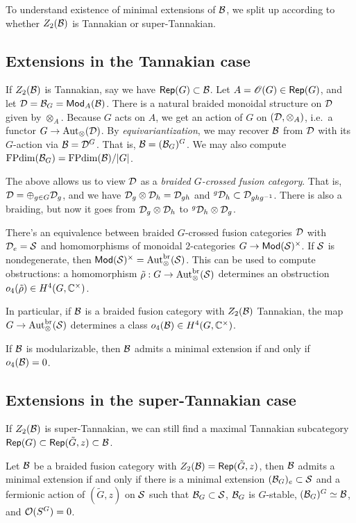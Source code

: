 \documentclass{amsart}
\begin{document}
To understand existence of minimal extensions of $\mathcal{B}$, we split up according to whether $Z_2(\mathcal{B})$ is Tannakian or super-Tannakian.

\subsection{Extensions in the Tannakian case}

If $Z_2(\mathcal{B})$ is Tannakian, say we have $\operatorname{\mathsf{Rep}}(G) \subset \mathcal{B}$.
Let $A = \mathscr{O}(G) \in \operatorname{\mathsf{Rep}}(G)$, and let $\mathcal{D} = \mathcal{B}_G = \mathsf{Mod}_A(\mathcal{B})$.
There is a natural braided monoidal structure on $\mathcal{D}$ given by $\otimes_A$.
Because $G$ acts on $A$, we get an action of $G$ on $(\mathcal{D}, \otimes_A)$, i.e.\ a functor $G \to \operatorname{Aut}_\otimes(\mathcal{D})$.
By \emph{equivariantization}, we may recover $\mathcal{B}$ from $\mathcal{D}$ with its $G$-action via $\mathcal{B} = \mathcal{D}^G$.
That is, $\mathcal{B} = (\mathcal{B}_G)^G$.
We may also compute $\operatorname{FPdim}(\mathcal{B}_G) = \operatorname{FPdim}(\mathcal{B}) / |G|$.

The above allows us to view $\mathcal{D}$ as a \emph{braided $G$-crossed fusion category}.
That is, $\mathcal{D} = \oplus_{g \in G} \mathcal{D}_g$, and we have $\mathcal{D}_g \otimes \mathcal{D}_h = \mathcal{D}_{gh}$ and ${}^g \mathcal{D}_h \subset \mathcal{D}_{g h g^{-1}}$.
There is also a braiding, but now it goes from $\mathcal{D}_g \otimes \mathcal{D}_h$ to ${}^g \mathcal{D}_h \otimes \mathcal{D}_g$.

There's an equivalence between braided $G$-crossed fusion categories $\mathcal{D}$ with $\mathcal{D}_e = \mathcal{S}$ and homomorphisms of monoidal $2$-categories $G \to \mathsf{Mod}(\mathcal{S})^\times$.
If $\mathcal{S}$ is nondegenerate, then $\mathsf{Mod}(\mathcal{S})^\times = \operatorname{Aut}_\otimes^{\mathrm{br}}(\mathcal{S})$.
This can be used to compute obstructions: a homomorphism $\tilde{\rho}: G \to \operatorname{Aut}_\otimes^{\mathrm{br}}(\mathcal{S})$ determines an obstruction $o_4(\tilde{\rho}) \in H^4(G, \mathbb{C}^\times)$.

In particular, if $\mathcal{B}$ is a braided fusion category with $Z_2(\mathcal{B})$ Tannakian, the map $G \to \operatorname{Aut}_\otimes^{\mathrm{br}}(\mathcal{S})$ determines a class $o_4(\mathcal{B}) \in H^4(G, \mathbb{C}^\times)$.

\begin{thm}
  If $\mathcal{B}$ is modularizable, then $\mathcal{B}$ admits a minimal extension if and only if $o_4(\mathcal{B}) = 0$.
\end{thm}

\subsection{Extensions in the super-Tannakian case}

If $Z_2(\mathcal{B})$ is super-Tannakian, we can still find a maximal Tannakian subcategory $\operatorname{\mathsf{Rep}}(G) \subset \operatorname{\mathsf{Rep}}(\tilde{G}, z) \subset \mathcal{B}$.
\begin{thm}
  Let $\mathcal{B}$ be a braided fusion category with $Z_2(\mathcal{B}) = \operatorname{\mathsf{Rep}}(\tilde{G}, z)$, then $\mathcal{B}$ admits a minimal extension if and only if
  there is a minimal extension $(\mathcal{B}_G)_e \subset \mathcal{S}$ and a fermionic action of $(\tilde{G}, z)$ on $\mathcal{S}$ such that
  $\mathcal{B}_G \subset \mathcal{S}$, $\mathcal{B}_G$ is $G$-stable, $(\mathcal{B}_G)^G \simeq \mathcal{B}$, and $\mathcal{O}(S^G) = 0$.
\end{thm}
\end{document}
